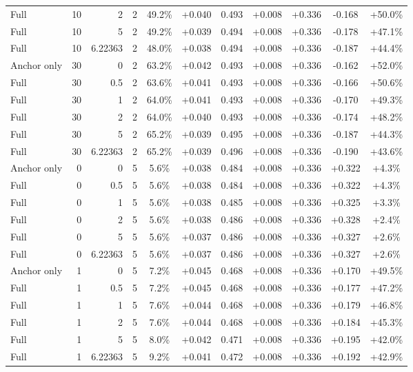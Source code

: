\begin{table}[htbp]
\begin{tabular}{lrrrccccccc}
Full & 10 & 2 & 2 & 49.2\% & +0.040 & 0.493 & +0.008 & +0.336 & -0.168 & +50.0\% \\
Full & 10 & 5 & 2 & 49.2\% & +0.039 & 0.494 & +0.008 & +0.336 & -0.178 & +47.1\% \\
Full & 10 & 6.22363 & 2 & 48.0\% & +0.038 & 0.494 & +0.008 & +0.336 & -0.187 & +44.4\% \\
Anchor only & 30 & 0 & 2 & 63.2\% & +0.042 & 0.493 & +0.008 & +0.336 & -0.162 & +52.0\% \\
Full & 30 & 0.5 & 2 & 63.6\% & +0.041 & 0.493 & +0.008 & +0.336 & -0.166 & +50.6\% \\
Full & 30 & 1 & 2 & 64.0\% & +0.041 & 0.493 & +0.008 & +0.336 & -0.170 & +49.3\% \\
Full & 30 & 2 & 2 & 64.0\% & +0.040 & 0.493 & +0.008 & +0.336 & -0.174 & +48.2\% \\
Full & 30 & 5 & 2 & 65.2\% & +0.039 & 0.495 & +0.008 & +0.336 & -0.187 & +44.3\% \\
Full & 30 & 6.22363 & 2 & 65.2\% & +0.039 & 0.496 & +0.008 & +0.336 & -0.190 & +43.6\% \\
Anchor only & 0 & 0 & 5 & 5.6\% & +0.038 & 0.484 & +0.008 & +0.336 & +0.322 & +4.3\% \\
Full & 0 & 0.5 & 5 & 5.6\% & +0.038 & 0.484 & +0.008 & +0.336 & +0.322 & +4.3\% \\
Full & 0 & 1 & 5 & 5.6\% & +0.038 & 0.485 & +0.008 & +0.336 & +0.325 & +3.3\% \\
Full & 0 & 2 & 5 & 5.6\% & +0.038 & 0.486 & +0.008 & +0.336 & +0.328 & +2.4\% \\
Full & 0 & 5 & 5 & 5.6\% & +0.037 & 0.486 & +0.008 & +0.336 & +0.327 & +2.6\% \\
Full & 0 & 6.22363 & 5 & 5.6\% & +0.037 & 0.486 & +0.008 & +0.336 & +0.327 & +2.6\% \\
Anchor only & 1 & 0 & 5 & 7.2\% & +0.045 & 0.468 & +0.008 & +0.336 & +0.170 & +49.5\% \\
Full & 1 & 0.5 & 5 & 7.2\% & +0.045 & 0.468 & +0.008 & +0.336 & +0.177 & +47.2\% \\
Full & 1 & 1 & 5 & 7.6\% & +0.044 & 0.468 & +0.008 & +0.336 & +0.179 & +46.8\% \\
Full & 1 & 2 & 5 & 7.6\% & +0.044 & 0.468 & +0.008 & +0.336 & +0.184 & +45.3\% \\
Full & 1 & 5 & 5 & 8.0\% & +0.042 & 0.471 & +0.008 & +0.336 & +0.195 & +42.0\% \\
Full & 1 & 6.22363 & 5 & 9.2\% & +0.041 & 0.472 & +0.008 & +0.336 & +0.192 & +42.9\% \\

\end{tabular}
\end{table}

